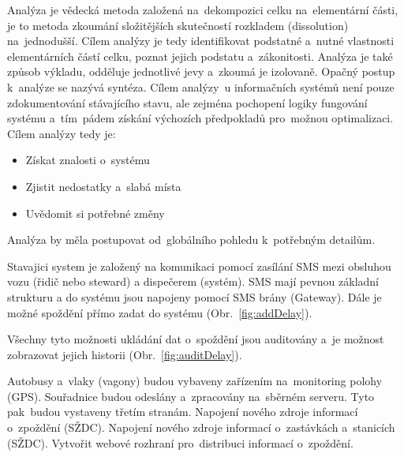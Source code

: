 

Analýza je vědecká metoda založená na~dekompozici celku na~elementární části, je to metoda
zkoumání složitějších skutečností rozkladem (dissolution) na~jednodušší. Cílem analýzy je tedy identifikovat podstatné a~nutné vlastnosti elementárních částí celku, poznat jejich podstatu a~zákonitosti. Analýza je také způsob výkladu, odděluje jednotlivé jevy a~zkoumá je izolovaně. Opačný postup k~analýze se nazývá syntéza. Cílem analýzy~u informačních systémů není pouze zdokumentování stávajícího stavu, ale zejména pochopení logiky fungování systému a~tím~pádem získání výchozích předpokladů pro~možnou optimalizaci.
Cílem analýzy tedy je:
\begin{itemize}
	\setlength{\parskip}{0pt}
	\setlength{\itemsep}{0pt}
	\item Získat znalosti o~systému
	\item Zjistit nedostatky a~slabá místa
	\item Uvědomit si potřebné změny
\end{itemize}
Analýza by měla postupovat od~globálního pohledu k~potřebným detailům.



Stavajici system je založený na komunikaci pomocí zasílání SMS mezi obsluhou vozu (řidič nebo steward) a dispečerem (systém). SMS mají pevnou základní strukturu a do systému jsou napojeny pomocí SMS brány (Gateway). Dále je možné spoždění přímo zadat do systému (Obr.~\ref{fig:addDelay}).

Všechny tyto možnosti ukládání dat o~spoždění jsou auditovány a~je možnost zobrazovat jejich historii (Obr.~\ref{fig:auditDelay}).


Autobusy a~vlaky (vagony) budou vybaveny zařízením na~monitoring polohy (GPS).
Souřadnice budou odeslány a~zpracovány na~sběrném serveru. Tyto pak~budou vystaveny třetím stranám.
Napojení nového zdroje informací o~zpoždění (SŽDC). Napojení nového zdroje informací o~zastávkách a~stanicích (SŽDC). Vytvořit webové rozhraní pro~distribuci informací o~zpoždění.

